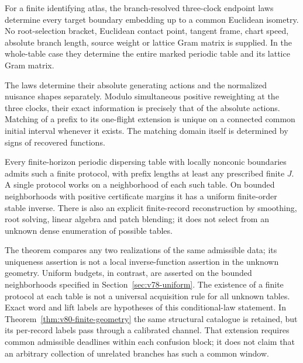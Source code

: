 \begin{theorem}
\label{thm:v78-main}\label{thm:v77-main}
For a finite identifying atlas, the branch-resolved three-clock endpoint
laws determine every target boundary embedding up to a common Euclidean
isometry.  No root-selection bracket, Euclidean contact point, tangent
frame, chart speed, absolute branch length, source weight or lattice
Gram matrix is supplied.  In the whole-table case they determine the
entire marked periodic table and its lattice Gram matrix.

The laws determine their absolute generating actions and the normalized
nuisance shapes separately.  Modulo simultaneous positive reweighting
at the three clocks, their exact information is precisely that of the
absolute actions.  Matching of a prefix to its one-flight extension is
unique on a connected common initial interval whenever it exists.
The matching domain itself is determined by signs of recovered functions.

Every finite-horizon periodic dispersing table with locally nonconic
boundaries admits such a finite protocol, with prefix lengths at least
any prescribed finite $J$.  A single protocol works on a neighborhood
of each such table.  On bounded neighborhoods with positive certificate
margins it has a uniform finite-order stable inverse.  There is also an
explicit finite-record reconstruction by smoothing, root solving,
linear algebra and patch blending; it does not select from an unknown
dense enumeration of possible tables.
\end{theorem}

The theorem compares any two realizations of the same admissible data;
its uniqueness assertion is not a local inverse-function assertion in
the unknown geometry.  Uniform budgets, in contrast, are asserted on the
bounded neighborhoods specified in Section~\ref{sec:v78-uniform}.
The existence of a finite protocol at each table is not a universal
acquisition rule for all unknown tables.  Exact word and lift labels
are hypotheses of this conditional-law statement.  In
Theorem~\ref{thm:v80-finite-geometry} the same structural catalogue is
retained, but its per-record labels pass through a calibrated channel.
That extension requires common admissible deadlines within each
confusion block; it does not claim that an arbitrary collection of
unrelated branches has such a common window.
